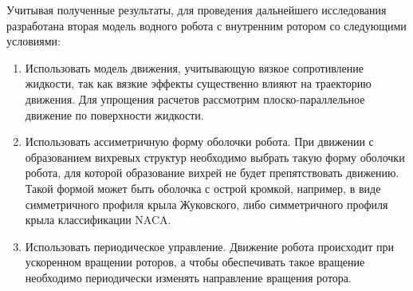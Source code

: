 Учитывая полученные результаты, для проведения дальнейшего исследования разработана вторая модель водного робота с внутренним ротором со следующими условиями:

\begin{enumerate}
	\item Использовать модель движения, учитывающую вязкое сопротивление жидкости, так как вязкие эффекты существенно влияют на траекторию движения. Для упрощения расчетов рассмотрим плоско-параллельное движение по поверхности жидкости.
	
	\item Использовать ассиметричную форму оболочки робота. При движении с образованием вихревых структур необходимо выбрать такую форму оболочки робота, для которой образование вихрей не будет препятствовать движению. Такой формой может быть оболочка с острой кромкой, например, в виде симметричного профиля крыла Жуковского, либо симметричного профиля крыла классификации NACA.
	
	\item Использовать периодическое управление. Движение робота происходит при ускоренном вращении роторов, а чтобы обеспечивать такое вращение необходимо периодически изменять направление вращения ротора. 
	
\end{enumerate}


	
	
\clearpage